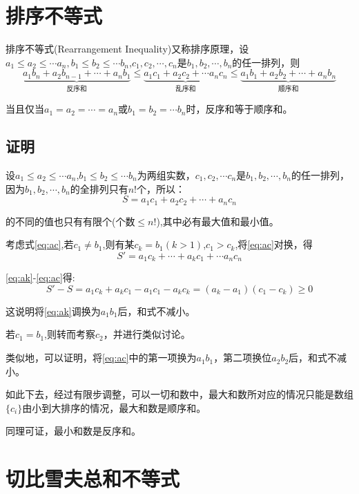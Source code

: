 \documentclass[a4paper]{article} %
\numberwithin{equation}{section} %
\begin{document}
\section{排序不等式}

排序不等式(Rearrangement Inequality)又称排序原理，设$a_1\le a_2\le \cdots a_n,b_1\le b_2\le\cdots b_n$,$c_1,c_2,\cdots,c_n$是$b_1,b_2,\cdots,b_n$的任一排列，则
\begin{equation}
 \underbrace{a_1b_n+a_2b_{n-1}+\cdots+a_nb_1}_{\text{反序和}}\le \underbrace{a_1c_1+a_2c_2+\cdots a_nc_n}_{\text{乱序和}}\le\underbrace{a_1b_1+a_2b_2+\cdots+a_nb_n}_{\text{顺序和}} 
\end{equation}

当且仅当$a_1=a_2=\cdots=a_n$或$b_1=b_2=\cdots b_n$时，反序和等于顺序和。

\subsection{证明}
设$a_1\le a_2\le \cdots a_n$,$b_1\le b_2\le \cdots b_n$为两组实数，$c_1,c_2,\cdots c_n$是$b_1,b_2,\cdots,b_n$的任一排列，因为$b_1,b_2,\cdots,b_n$的全排列只有$n!$个，所以：
\begin{equation}
S=a_1c_1+a_2c_2+\cdots+a_nc_n \label{eq:ac}
\end{equation}

的不同的值也只有有限个(个数$\le n!$),其中必有最大值和最小值。

考虑式\eqref{eq:ac},若$c_1\neq b_1$,则有某$c_k=b_1(k>1)$,$c_1>c_k$,将\eqref{eq:ac}对换，得
\begin{equation}
S'=a_1c_k+\cdots +a_kc_1+\cdots a_nc_n \label{eq:ak}
\end{equation}

\eqref{eq:ak}-\eqref{eq:ac}得:
\begin{equation}
S'-S=a_1c_k+a_kc_1-a_1c_1-a_kc_k=(a_k-a_1)(c_1-c_k)\ge 0
\end{equation}

这说明将\eqref{eq:ak}调换为$a_1b_1$后，和式不减小。

若$c_1=b_1$,则转而考察$c_2$，并进行类似讨论。

类似地，可以证明，将\eqref{eq:ac}中的第一项换为$a_1b_1$，第二项换位$a_2b_2$后，和式不减小。

如此下去，经过有限步调整，可以一切和数中，最大和数所对应的情况只能是数组$\{c_i\}$由小到大排序的情况，最大和数是顺序和。

同理可证，最小和数是反序和。


\section{切比雪夫总和不等式}
\end{document}
